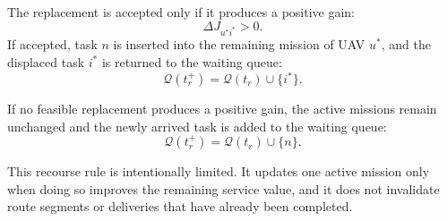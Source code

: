 The replacement is accepted only if it produces a positive gain:
\begin{equation}
\Delta J_{u^*i^*}>0.
\end{equation}
If accepted, task $n$ is inserted into the remaining mission of UAV $u^*$, and
the displaced task $i^*$ is returned to the waiting queue:
\begin{equation}
\mathcal{Q}(t_r^+)
=
\mathcal{Q}(t_r)\cup\{i^*\}.
\end{equation}

If no feasible replacement produces a positive gain, the active missions
remain unchanged and the newly arrived task is added to the waiting queue:
\begin{equation}
\mathcal{Q}(t_r^+)
=
\mathcal{Q}(t_r)\cup\{n\}.
\end{equation}

This recourse rule is intentionally limited. It updates one active mission
only when doing so improves the remaining service value, and it does not
invalidate route segments or deliveries that have already been completed.
